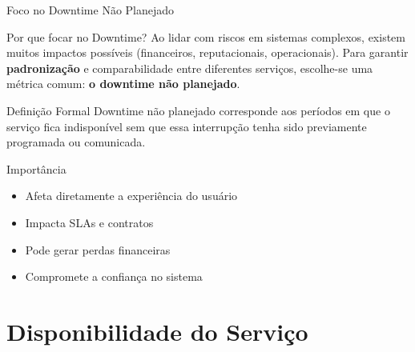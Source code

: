 \documentclass[9pt]{beamer}
\begin{document}
\begin{frame}{Foco no Downtime Não Planejado}

\begin{block}{Por que focar no Downtime?}
Ao lidar com riscos em sistemas complexos, existem muitos impactos possíveis 
(financeiros, reputacionais, operacionais). Para garantir \textbf{padronização} 
e comparabilidade entre diferentes serviços, escolhe-se uma métrica comum:
\textbf{o downtime não planejado}.
\end{block}

\begin{exampleblock}{Definição Formal}
Downtime não planejado corresponde aos períodos em que o serviço
fica indisponível sem que essa interrupção tenha sido previamente
programada ou comunicada.
\end{exampleblock}

\begin{alertblock}{Importância}
\begin{itemize}
    \item Afeta diretamente a experiência do usuário
    \item Impacta SLAs e contratos
    \item Pode gerar perdas financeiras
    \item Compromete a confiança no sistema
\end{itemize}
\end{alertblock}

\begin{center}
\end{center}

\end{frame}
\section{Disponibilidade do Serviço}
\end{document}

